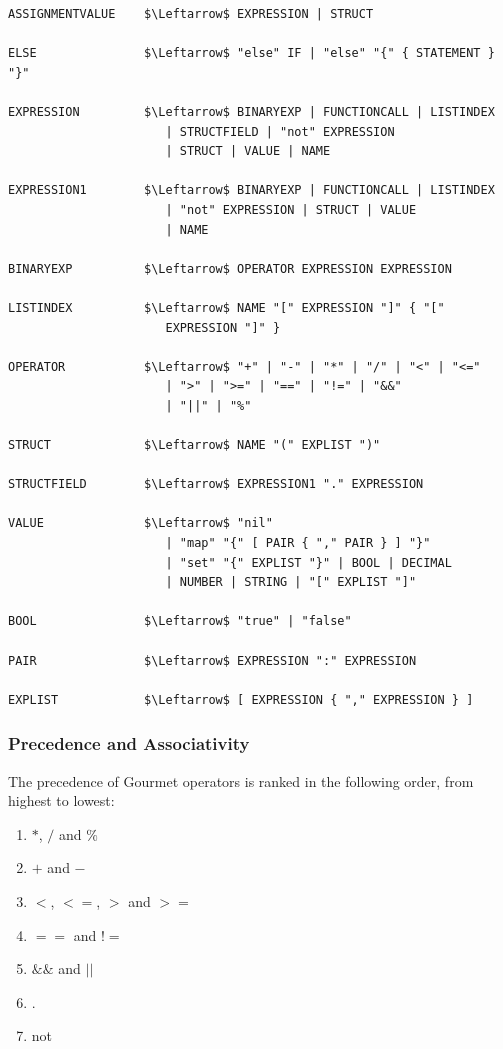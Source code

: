 \begin{lstlisting}[caption={Gourmet's grammar in EBNF notation.}, captionpos=b, label={The EBNF grammar of the Gourmet programming language.}]
ASSIGNMENTVALUE    $\Leftarrow$ EXPRESSION | STRUCT

ELSE               $\Leftarrow$ "else" IF | "else" "{" { STATEMENT } "}"

EXPRESSION         $\Leftarrow$ BINARYEXP | FUNCTIONCALL | LISTINDEX
                      | STRUCTFIELD | "not" EXPRESSION
                      | STRUCT | VALUE | NAME

EXPRESSION1        $\Leftarrow$ BINARYEXP | FUNCTIONCALL | LISTINDEX
                      | "not" EXPRESSION | STRUCT | VALUE
                      | NAME

BINARYEXP          $\Leftarrow$ OPERATOR EXPRESSION EXPRESSION

LISTINDEX          $\Leftarrow$ NAME "[" EXPRESSION "]" { "["
                      EXPRESSION "]" }

OPERATOR           $\Leftarrow$ "+" | "-" | "*" | "/" | "<" | "<="
                      | ">" | ">=" | "==" | "!=" | "&&"
                      | "||" | "%"

STRUCT             $\Leftarrow$ NAME "(" EXPLIST ")"

STRUCTFIELD        $\Leftarrow$ EXPRESSION1 "." EXPRESSION

VALUE              $\Leftarrow$ "nil"
                      | "map" "{" [ PAIR { "," PAIR } ] "}"
                      | "set" "{" EXPLIST "}" | BOOL | DECIMAL
                      | NUMBER | STRING | "[" EXPLIST "]"

BOOL               $\Leftarrow$ "true" | "false"

PAIR               $\Leftarrow$ EXPRESSION ":" EXPRESSION

EXPLIST            $\Leftarrow$ [ EXPRESSION { "," EXPRESSION } ]
\end{lstlisting}

\subsubsection{Precedence and Associativity}

The precedence of Gourmet operators is ranked in the following order, from highest to lowest:

\begin{enumerate}
    \item $*$, $/$ and $\%$
    \item $+$ and $-$
    \item $<$, $<=$, $>$ and $>=$
    \item $==$ and $!=$
    \item $\&\&$ and $||$
    \item $.$
    \item not
\end{enumerate}


